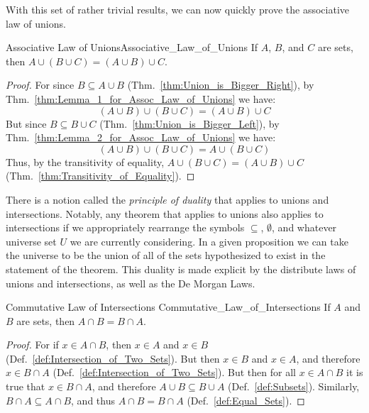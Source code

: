         With this set of rather trivial results, we can now quickly prove the
        associative law of unions.
        \begin{ltheorem}{Associative Law of Unions}{Associative_Law_of_Unions}
            If $A$, $B$, and $C$ are sets, then
            $A\cup(B\cup{C})=(A\cup{B})\cup{C}$.
        \end{ltheorem}
        \begin{proof}
            For since $B\subseteq{A}\cup{B}$
            (Thm.~\ref{thm:Union_is_Bigger_Right}), by
            Thm.~\ref{thm:Lemma_1_for_Assoc_Law_of_Unions} we have:
            \begin{equation}
                (A\cup{B})\cup(B\cup{C})=(A\cup{B})\cup{C}
            \end{equation}
            But since $B\subseteq{B}\cup{C}$
            (Thm.~\ref{thm:Union_is_Bigger_Left}),
            by Thm.~\ref{thm:Lemma_2_for_Assoc_Law_of_Unions} we have:
            \begin{equation}
                (A\cup{B})\cup(B\cup{C})=A\cup(B\cup{C})
            \end{equation}
            Thus, by the transitivity of equality,
            $A\cup(B\cup{C})=(A\cup{B})\cup{C}$
            (Thm.~\ref{thm:Transitivity_of_Equality}).
        \end{proof}
        There is a notion called the \textit{principle of duality}%
         that applies to unions and intersections.
        Notably, any theorem that applies to unions also applies to
        intersections if we appropriately rearrange the symbols $\subseteq$,
        $\emptyset$, and whatever universe set $U$ we are currently considering.
        In a given proposition we can take the universe to be the union of all
        of the sets hypothesized to exist in the statement of the theorem. This
        duality is made explicit by the distribute laws of unions and
        intersections, as well as the De Morgan Laws.
        \begin{ltheorem}{Commutative Law of Intersections}
                        {Commutative_Law_of_Intersections}
            If $A$ and $B$ are sets, then $A\cap{B}=B\cap{A}$.
        \end{ltheorem}
        \begin{proof}
            For if $x\in{A}\cap{B}$, then $x\in{A}$ and $x\in{B}$
            (Def.~\ref{def:Intersection_of_Two_Sets}). But then $x\in{B}$ and
            $x\in{A}$, and therefore $x\in{B}\cap{A}$
            (Def.~\ref{def:Intersection_of_Two_Sets}). But then for all
            $x\in{A}\cap{B}$ it is true that $x\in{B}\cap{A}$, and therefore
            $A\cup{B}\subseteq{B}\cup{A}$ (Def.~\ref{def:Subsets}). Similarly,
            $B\cap{A}\subseteq{A}\cap{B}$, and thus $A\cap{B}=B\cap{A}$
            (Def.~\ref{def:Equal_Sets}).
        \end{proof}
